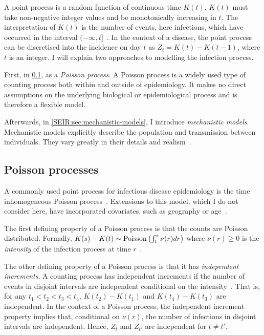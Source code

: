 \documentclass[thesis.tex]{subfiles}
\begin{document}
A point process is a random function of continuous time $K(t)$.
$K(t)$ must take non-negative integer values and be monotonically increasing in $t$.
The interpretation of $K(t)$ is the number of events, here infections, which have occurred in the interval $(-\infty, t]$~\autocite[244]{yanDistribution}.
In the context of a disease, the point process can be discretised into the incidence on day $t$ as $Z_t = K(t) - K(t-1)$, where $t$ is an integer.
I will explain two approaches to modelling the infection process.

First, in \cref{inc-prev:sec:poisson-process}, as a \emph{Poisson process}.
A Poisson process is a widely used type of counting process both within and outside of epidemiology.
It makes no direct assumptions on the underlying biological or epidemiological process and is therefore a flexible model.

Afterwards, in \cref{SEIR:sec:mechanistic-models}, I introduce \emph{mechanistic models}.
Mechanistic models explicitly describe the population and transmission between individuals.
They vary greatly in their details and realism~\autocite{murilloMultiscale}.

\subsection{Poisson processes} \label{inc-prev:sec:poisson-process}

A commonly used point process for infectious disease epidemiology is the time inhomogeneous Poisson process~\autocite[e.g., in the context of HIV,][]{brookmeyerMethod,paganoHIV,rosenbergBackcalculation,brookmeyerBackcalculation}.
Extensions to this model, which I do not consider here, have incorporated covariates, such as geography or age~\autocite[e.g.][]{diggleModeling}.

The first defining property of a Poisson process is that the counts are Poisson distributed.
Formally, $K(s) - K(t) \sim \operatorname{Poisson}\left(\int^s_t \nu(r) dr \right)$ where $\nu(r) \geq 0$ is the \emph{intensity} of the infection process at time $r$~\autocite[244]{yanDistribution}.

The other defining property of a Poisson process is that it has \emph{independent increments}.
A counting process has independent increments if the number of events in disjoint intervals are independent conditional on the intensity~\autocite[244]{yanDistribution}.
That is, for any $t_1 < t_2 < t_3 < t_4$, $K(t_2) - K(t_1)$ and $K(t_4) - K(t_3)$ are independent.
In the context of a Poisson process, the independent increment property implies that, conditional on $\nu(r)$, the number of infections in disjoint intervals are independent.
Hence, $Z_t$ and $Z_{t'}$ are independent for $t \neq t'$.
\end{document}
